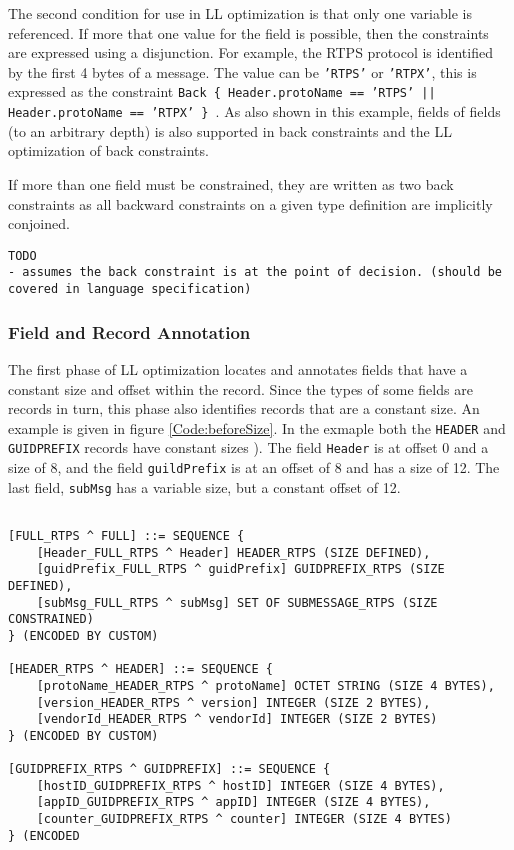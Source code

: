 \documentclass[12pt,oneside,letterpaper]{article}
\begin{document}
The second condition for use in LL optimization is that only one variable is referenced. If more that one value for the field is possible, then the constraints are expressed using a disjunction. For example, the RTPS protocol is identified by the first 4 bytes of a message. The value can be \texttt{'RTPS'} or \texttt{'RTPX'}, this is expressed as the constraint \texttt{Back \{ Header.protoName == 'RTPS' || Header.protoName == 'RTPX' \} }. As also shown in this example, fields of fields (to an arbitrary depth) is also supported in back constraints and the LL optimization of back constraints.

If more than one field must be constrained, they are written as two back constraints as all backward constraints on a given type definition are implicitly conjoined.
\begin{verbatim}
TODO
- assumes the back constraint is at the point of decision. (should be covered in language specification)
\end{verbatim}

\subsubsection{Field and Record Annotation}

The first phase of LL optimization locates and annotates fields that have a constant size and offset within the record. Since the types of some fields are records in turn, this phase also identifies records that are a constant size. An example is given in figure \ref{Code:beforeSize}. In the exmaple both the \texttt{HEADER} and \texttt{GUIDPREFIX} records have constant sizes ). The field \texttt{Header} is at offset 0 and a size of 8, and the field \texttt{guildPrefix} is at an offset of 8 and has a size of 12. The last field, \texttt{subMsg} has a variable size, but a constant offset of 12.

\begin{lstlisting}[language=SCL2,style=mystyle,frame=none,float,
caption=Before Size Annotations,label=Code:beforeSize, xleftmargin=3.5ex]

[FULL_RTPS ^ FULL] ::= SEQUENCE {
    [Header_FULL_RTPS ^ Header] HEADER_RTPS (SIZE DEFINED),
    [guidPrefix_FULL_RTPS ^ guidPrefix] GUIDPREFIX_RTPS (SIZE DEFINED),
    [subMsg_FULL_RTPS ^ subMsg] SET OF SUBMESSAGE_RTPS (SIZE CONSTRAINED)
} (ENCODED BY CUSTOM)

[HEADER_RTPS ^ HEADER] ::= SEQUENCE {
    [protoName_HEADER_RTPS ^ protoName] OCTET STRING (SIZE 4 BYTES),
    [version_HEADER_RTPS ^ version] INTEGER (SIZE 2 BYTES),
    [vendorId_HEADER_RTPS ^ vendorId] INTEGER (SIZE 2 BYTES)
} (ENCODED BY CUSTOM)

[GUIDPREFIX_RTPS ^ GUIDPREFIX] ::= SEQUENCE {
    [hostID_GUIDPREFIX_RTPS ^ hostID] INTEGER (SIZE 4 BYTES),
    [appID_GUIDPREFIX_RTPS ^ appID] INTEGER (SIZE 4 BYTES),
    [counter_GUIDPREFIX_RTPS ^ counter] INTEGER (SIZE 4 BYTES)
} (ENCODED 
    
\end{lstlisting}
\end{document}
